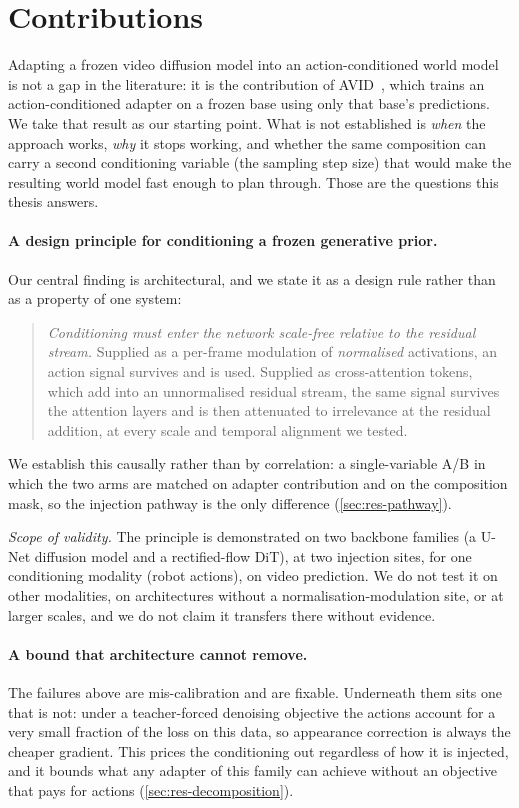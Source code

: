 \section{Contributions}
\label{sec:contributions}

Adapting a frozen video diffusion model into an action-conditioned world
model is not a gap in the literature: it is the contribution of
AVID~\citep{rigter2024avid}, which trains an action-conditioned adapter
on a frozen base using only that base's predictions. We take that result as
our starting point. What is not established is \emph{when} the approach
works, \emph{why} it stops working, and whether the same composition can
carry a second conditioning variable (the sampling step size) that
would make the resulting world model fast enough to plan through. Those are
the questions this thesis answers.

\paragraph{A design principle for conditioning a frozen generative prior.}
Our central finding is architectural, and we state it as a design rule
rather than as a property of one system:

\begin{quote}
\emph{Conditioning must enter the network scale-free relative to the
residual stream.} Supplied as a per-frame modulation of \emph{normalised}
activations, an action signal survives and is used. Supplied as
cross-attention tokens, which add into an unnormalised residual stream,
the same signal survives the attention layers and is then attenuated to
irrelevance at the residual addition, at every scale and temporal alignment
we tested.
\end{quote}

We establish this causally rather than by correlation: a single-variable A/B
in which the two arms are matched on adapter contribution and on the
composition mask, so the injection pathway is the only difference
(\cref{sec:res-pathway}).

\emph{Scope of validity.} The principle is demonstrated on two backbone
families (a U-Net diffusion model and a rectified-flow DiT), at two
injection sites, for one conditioning modality (robot actions), on video
prediction. We do not test it on other modalities, on architectures without
a normalisation-modulation site, or at larger scales, and we do not claim it
transfers there without evidence.

\paragraph{A bound that architecture cannot remove.} The failures above are
mis-calibration and are fixable. Underneath them sits one that is not: under
a teacher-forced denoising objective the actions account for a very small
fraction of the loss on this data, so appearance correction is always the
cheaper gradient. This prices the conditioning out regardless of how it is
injected, and it bounds what any adapter of this family can achieve without
an objective that pays for actions (\cref{sec:res-decomposition}).

